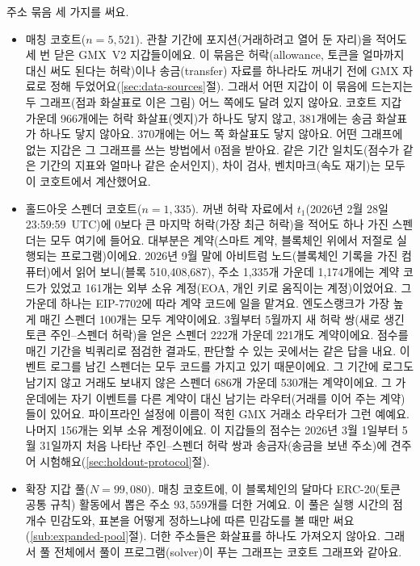 주소 묶음 세 가지를 써요.

\begin{itemize}
\item 매칭 코호트($n=5{,}521$). 관찰 기간에 포지션(거래하려고 열어 둔 자리)을 적어도 세 번 닫은 GMX~V2 지갑들이에요. 이 묶음은 허락(allowance, 토큰을 얼마까지 대신 써도 된다는 허락)이나 송금(transfer) 자료를 하나라도 꺼내기 전에 GMX 자료로 정해 두었어요(\ref{sec:data-sources}절). 그래서 어떤 지갑이 이 묶음에 드는지는 두 그래프(점과 화살표로 이은 그림) 어느 쪽에도 달려 있지 않아요. 코호트 지갑 가운데 $966$개에는 허락 화살표(엣지)가 하나도 닿지 않고, $381$개에는 송금 화살표가 하나도 닿지 않아요. $370$개에는 어느 쪽 화살표도 닿지 않아요. 어떤 그래프에 없는 지갑은 그 그래프를 쓰는 방법에서 0점을 받아요. 같은 기간 일치도(점수가 같은 기간의 지표와 얼마나 같은 순서인지), 차이 검사, 벤치마크(속도 재기)는 모두 이 코호트에서 계산했어요.
\item 홀드아웃 스펜더 코호트($n=1{,}335$). 꺼낸 허락 자료에서 $t_1$(2026년 2월 28일 23:59:59~UTC)에 0보다 큰 마지막 허락(가장 최근 허락)을 적어도 하나 가진 스펜더는 모두 여기에 들어요. 대부분은 계약(스마트 계약, 블록체인 위에서 저절로 실행되는 프로그램)이에요. 2026년 9월 말에 아비트럼 노드(블록체인 기록을 가진 컴퓨터)에서 읽어 보니(블록 510{,}408{,}687), 주소 1,335개 가운데 1,174개에는 계약 코드가 있었고 161개는 외부 소유 계정(EOA, 개인 키로 움직이는 계정)이었어요. 그 가운데 하나는 EIP-7702에 따라 계약 코드에 일을 맡겨요. 엔도스랭크가 가장 높게 매긴 스펜더 100개는 모두 계약이에요. 3월부터 5월까지 새 허락 쌍(새로 생긴 토큰 주인--스펜더 허락)을 얻은 스펜더 222개 가운데 221개도 계약이에요. 점수를 매긴 기간을 빅쿼리로 점검한 결과도, 판단할 수 있는 곳에서는 같은 답을 내요. 이벤트 로그를 남긴 스펜더는 모두 코드를 가지고 있기 때문이에요. 그 기간에 로그도 남기지 않고 거래도 보내지 않은 스펜더 686개 가운데 530개는 계약이에요. 그 가운데에는 자기 이벤트를 다른 계약이 대신 남기는 라우터(거래를 이어 주는 계약)들이 있어요. 파이프라인 설정에 이름이 적힌 GMX 거래소 라우터가 그런 예예요. 나머지 156개는 외부 소유 계정이에요. 이 지갑들의 점수는 2026년 3월 1일부터 5월 31일까지 처음 나타난 주인--스펜더 허락 쌍과 송금자(송금을 보낸 주소)에 견주어 시험해요(\ref{sec:holdout-protocol}절).
\item 확장 지갑 풀($N=99{,}080$). 매칭 코호트에, 이 블록체인의 달마다 ERC-20(토큰 공통 규칙) 활동에서 뽑은 주소 $93{,}559$개를 더한 거예요. 이 풀은 실행 시간의 점 개수 민감도와, 표본을 어떻게 정하느냐에 따른 민감도를 볼 때만 써요(\ref{sub:expanded-pool}절). 더한 주소들은 화살표를 하나도 가져오지 않아요. 그래서 풀 전체에서 풀이 프로그램(solver)이 푸는 그래프는 코호트 그래프와 같아요.
\end{itemize}

